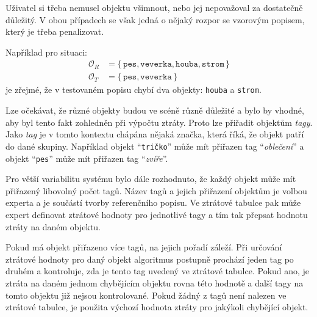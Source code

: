 Uživatel si třeba nemusel objektu všimnout, nebo jej nepovažoval za dostatečně důležitý.
V obou případech se však jedná o nějaký rozpor se vzorovým popisem, který je třeba penalizovat.

Například pro situaci:
\begin{align*}
	\mathcal{O}_{R} & = \bigl\{\, \texttt{pes}, \texttt{veverka}, \texttt{houba}, \texttt{strom}\, \bigr\} \\
	\mathcal{O}_{T} & = \bigl\{\, \texttt{pes}, \texttt{veverka}\, \bigr\}
\end{align*}
je zřejmé, že v testovaném popisu chybí dva objekty: \texttt{houba} a \texttt{strom}.

Lze očekávat, že různé objekty budou ve scéně různě důležité a bylo by vhodné, aby byl tento fakt zohledněn při výpočtu ztráty.
Proto lze přiřadit objektům \emph{tagy}.
Jako \emph{tag} je v tomto kontextu chápána nějaká značka, která říká, že objekt patří do dané skupiny.
Například objekt \enquote{\texttt{tričko}} může mít přiřazen tag \enquote{\emph{oblečení}} a objekt \enquote{\texttt{pes}}
může mít přiřazen tag \enquote{\emph{zvíře}}.

Pro větší variabilitu systému bylo dále rozhodnuto, že každý objekt může mít přiřazený libovolný počet tagů.
Název tagů a jejich přiřazení objektům je volbou experta a je součástí tvorby referenčního popisu.
Ve ztrátové tabulce pak může expert definovat ztrátové hodnoty pro jednotlivé tagy a tím tak přepsat hodnotu ztráty na daném objektu.

Pokud má objekt přiřazeno více tagů, na jejich pořadí záleží.
Při určování ztrátové hodnoty pro daný objekt algoritmus postupně prochází jeden tag po druhém a kontroluje, zda je tento tag uvedený ve ztrátové tabulce.
Pokud ano, je ztráta na daném jednom chybějícím objektu rovna této hodnotě a další tagy na tomto objektu již nejsou kontrolované.
Pokud žádný z tagů není nalezen ve ztrátové tabulce, je použita výchozí hodnota ztráty pro jakýkoli chybějící objekt.

